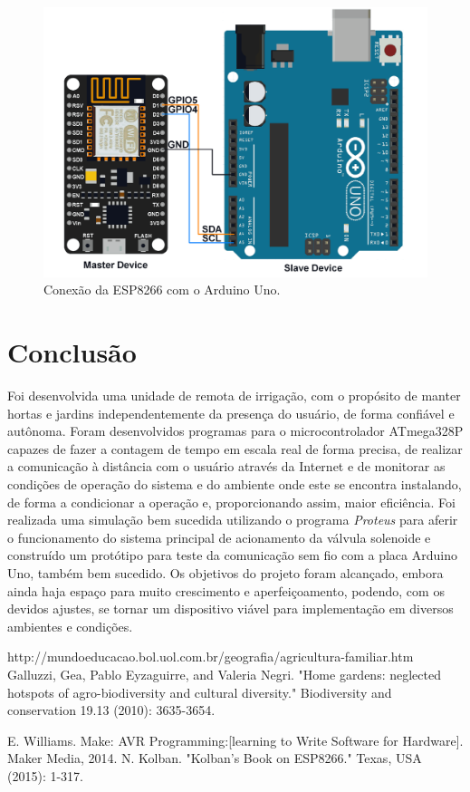 \documentclass[conference]{IEEEtran}
\begin{document}
\begin{figure}[htbp]
\centerline{\includegraphics[angle=0, scale=.2]{Img4.png}}
\caption{Conexão da ESP8266 com o Arduino Uno.}
\label{fig4}
\end{figure}


\section{Conclusão}

Foi desenvolvida uma unidade de remota de irrigação, com o propósito de manter hortas e jardins independentemente da presença do usuário, de forma confiável e autônoma. Foram desenvolvidos programas para o microcontrolador ATmega328P capazes de fazer a contagem de tempo em escala real de forma precisa, de realizar a comunicação à distância com o usuário através da Internet e de monitorar as condições de operação do sistema e do ambiente onde este se encontra instalando, de forma a condicionar a operação e, proporcionando assim, maior eficiência. Foi realizada uma simulação bem sucedida utilizando o programa \textit{Proteus} para aferir o funcionamento do sistema principal de acionamento da válvula solenoide e construído um protótipo para teste da comunicação sem fio com a placa Arduino Uno, também bem sucedido. Os objetivos do projeto foram alcançado, embora ainda haja espaço para muito crescimento e aperfeiçoamento, podendo, com os devidos ajustes, se tornar um dispositivo viável para implementação em diversos ambientes e condições.

\begin{thebibliography}{00}
 http://mundoeducacao.bol.uol.com.br/geografia/agricultura-familiar.htm
 Galluzzi, Gea, Pablo Eyzaguirre, and Valeria Negri. "Home gardens: neglected hotspots of agro-biodiversity and cultural diversity." Biodiversity and conservation 19.13 (2010): 3635-3654.

 E. Williams. Make: AVR Programming:[learning to Write Software for Hardware]. Maker Media, 2014.
 N. Kolban. "Kolban’s Book on ESP8266." Texas, USA (2015): 1-317.
\end{thebibliography}
\end{document}
